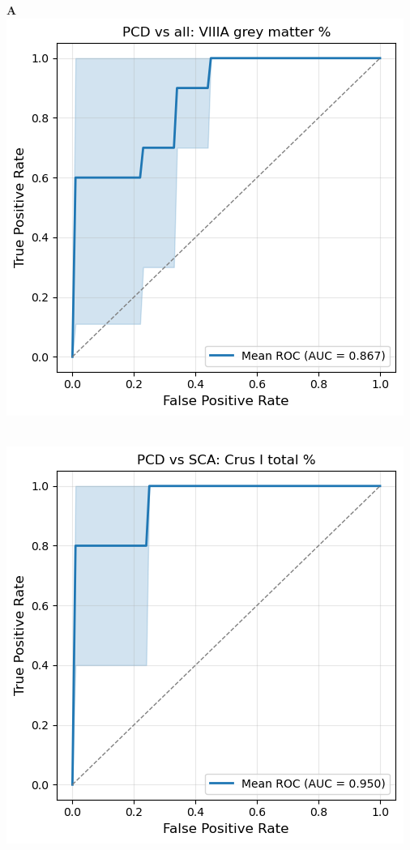 \documentclass{standalone}
\begin{document}
\centering
\begin{minipage}[t]{0.19\textwidth}
    \textbf{A}\\[4pt]
    \includegraphics[width=\textwidth]{graphics/ROC_PCD_vs_all.png}
\end{minipage}
\begin{minipage}[t]{0.19\textwidth}
    \textbf{}\\[4pt]
    \includegraphics[width=\textwidth]{graphics/ROC_PCD_vs_SCA.png}
\end{minipage}
\end{document}
